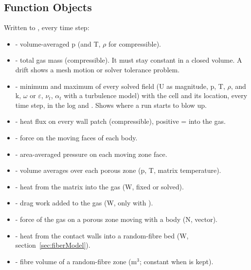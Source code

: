 \subsection{Function Objects}
Written to , every time step:
\begin{itemize}
    \item {} - volume-averaged p (and T, $\rho$ for compressible).
    \item {} - total gas mass (compressible). It must stay constant in a closed volume. A drift shows a mesh motion or solver tolerance problem.
    \item {} - minimum and maximum of every solved field (U as magnitude, p, T, $\rho$, and k, $\omega$ or $\varepsilon$, $\nu_t$, $\alpha_t$ with a turbulence model) with the cell and its location, every time step, in the log and . Shows where a run starts to blow up.
    \item {} - heat flux on every wall patch (compressible), positive = into the gas.
    \item {} - force on the moving faces of each body.
    \item {} - area-averaged pressure on each moving zone face.
    \item {} - volume averages over each porous zone (p, T, matrix temperature).
    \item {} - heat from the matrix into the gas (W,  fixed or solved).
    \item {} - drag work added to the gas (W, only with ).
    \item {} - force of the gas on a porous zone moving with a body (N, vector).
    \item {} - heat from the contact walls into a random-fibre bed (W, section~\ref{sec:fiberModel}).
    \item {} - fibre volume of a random-fibre zone (m$^3$; constant when  is kept).
\end{itemize}

